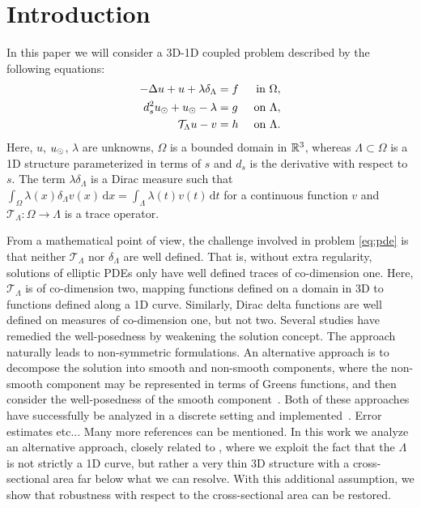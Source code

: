 \documentclass[r]{siamart171218}
\begin{document}
\section{Introduction}\label{sec:intro}

In this paper we will consider a 3D-1D coupled problem described by the following equations:\\
\begin{subequations}
\label{eq:pde}
\begin{align}
\label{eq:pde1}
  -\Delta u + u + \lambda \delta_{\Lambda} &= f &\mbox{ in } \Omega,\\
\label{eq:pde2}
 d_s^2 \ud + \ud - \lambda &= g &\mbox{ on } \Lambda,\\
\label{eq:coupling}
\mathcal{T}_\Lambda u - v  &=  h &\mbox{ on } \Lambda . 
\end{align}
\end{subequations}
%
Here, $u$, $u_{\odot}$,  $\lambda$ are unknowns,  $\Omega$ is a bounded domain in $\mathbb{R}^3$, whereas $\Lambda \subset \Omega$ is a 1D structure
parameterized in terms of $s$ and $d_s$ is the derivative with respect to $s$. 
The term $\lambda\delta_{\Lambda}$ is a Dirac measure such that 
$\int_{\Omega}\lambda(x)\delta_{\Lambda}v(x)\,\mathrm{d}x=\int_{\Lambda}\lambda(t)v(t) \,\mathrm{d}t$
for a continuous function $v$ and $\mathcal{T}_\Lambda: \Omega\rightarrow\Lambda$ is a trace operator. 



From a mathematical point of view, the challenge involved in problem \eqref{eq:pde} is that neither $\mathcal{T}_\Lambda$ nor $\delta_\Lambda$ are well defined. 
That is, without extra regularity,  solutions of elliptic PDEs only have well defined traces of co-dimension one. Here, $\mathcal{T}_\Lambda$ is of co-dimension two, mapping functions defined on a domain in 3D to
functions defined along a 1D curve. Similarly, Dirac delta functions are well defined on measures of co-dimension one, but not two. Several studies \cite{DAngelo,d2012finite,d2008coupling} have remedied the well-posedness by weakening the solution concept. The approach naturally leads to non-symmetric formulations. An alternative approach is to decompose the solution into smooth and non-smooth components, where the non-smooth component may be represented in terms of Greens functions, and then consider the well-posedness of the smooth component~\cite{Peaceman1983531,secomb2004green}. Both of these approaches have successfully be analyzed in a discrete setting and implemented~\cite{}. Error estimates etc... Many more references can be mentioned. 
In this work we analyze an alternative approach, closely related to \cite{laurino_m2an}, where we exploit the fact that the $\Lambda$ is not strictly a 1D curve, but rather a very thin 3D structure with 
a cross-sectional area far below what we can resolve. With this additional assumption, we show that robustness with respect to the cross-sectional area can be restored. 
\end{document}
